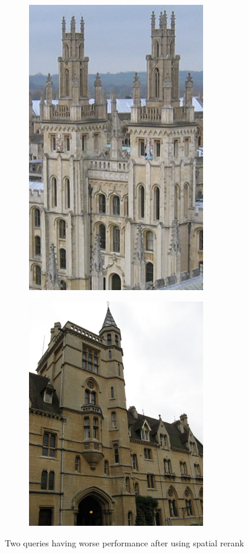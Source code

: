 \begin{figure}
  
    \begin{subfigure}{.5\textwidth}
        \centering
        \includegraphics[width=3.0in]{all_souls_4_query.png}
    \end{subfigure}
        
    \begin{subfigure}{.5\textwidth}
        \centering
        \includegraphics[width=3.0in]{balliol_2_query.png}
    \end{subfigure}
        
    \caption{Two queries having worse performance after using spatial rerank}
    \label{fig:bad_queries}
\end{figure}

